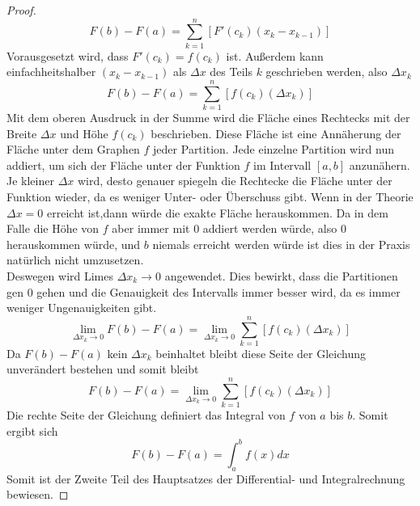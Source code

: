 \documentclass[fontsize=12pt,paper=a4,DIV12,cleardoublepage=empty, 
liststotoc,idxtotoc,bibtotoc]{article}
\theoremstyle{plain}
\theoremstyle{definition}
\begin{document}
\begin{proof}
\begin{equation*}
		F(b)-F(a)=\sum_{k=1}^{n} [F'(c_k)(x_k-x_{k-1})]
	\end{equation*}
	Vorausgesetzt wird, dass $F'(c_k)=f(c_k)$ ist. Außerdem kann einfachheitshalber $(x_k-x_{k-1})$ als $\Delta x$ des Teils $k$ geschrieben werden, also $\Delta x_k$
	\begin{equation}
		F(b)-F(a)=\sum_{k=1}^{n} [f(c_k)(\Delta x_k)]
	\end{equation}
	\newpage
Mit dem oberen Ausdruck in der Summe wird die Fläche eines Rechtecks mit der Breite $\Delta x$ und Höhe $f(c_k)$ beschrieben. Diese Fläche ist eine Annäherung der Fläche unter dem Graphen $f$ jeder Partition. Jede einzelne Partition wird nun addiert, um sich der Fläche unter der Funktion $f$ im Intervall $[a, b]$ anzunähern. Je kleiner $\Delta x$ wird, desto genauer spiegeln die Rechtecke die Fläche unter der Funktion wieder, da es weniger Unter- oder Überschuss gibt. Wenn in der Theorie $\Delta x = 0$ erreicht ist,dann  würde die exakte Fläche herauskommen. Da in dem Falle die Höhe von $f$ aber immer mit $0$ addiert werden würde, also $0$ herauskommen würde, und $b$ niemals erreicht werden würde ist dies in der Praxis natürlich nicht umzusetzen.\\
	Deswegen wird Limes $\Delta x_k \to 0$ angewendet. Dies bewirkt, dass die Partitionen gen 0 gehen und die Genauigkeit des Intervalls immer besser wird, da es immer weniger Ungenauigkeiten gibt.
	\begin{equation*}
		\lim \limits_{\Delta x_k \to 0} F(b)-F(a)=\lim \limits_{\Delta x_k \to 0} \sum_{k=1}^{n} [f(c_k)(\Delta x_k)]
	\end{equation*}
	Da $F(b)-F(a)$ kein $\Delta x_k$ beinhaltet bleibt diese Seite der Gleichung unverändert bestehen und somit bleibt
	\begin{equation*}
		F(b)-F(a)=\lim \limits_{\Delta x_k \to 0} \sum_{k=1}^{n} [f(c_k)(\Delta x_k)]
	\end{equation*}
	Die rechte Seite der Gleichung definiert das Integral von $f$ von $a$ bis $b$. Somit ergibt sich
	\begin{equation*}
		F(b)-F(a)=\int_{a}^{b}f(x)dx
	\end{equation*}
	Somit ist der Zweite Teil des Hauptsatzes der Differential- und Integralrechnung bewiesen.
	\end{proof}
	
	
	
\end{document}
